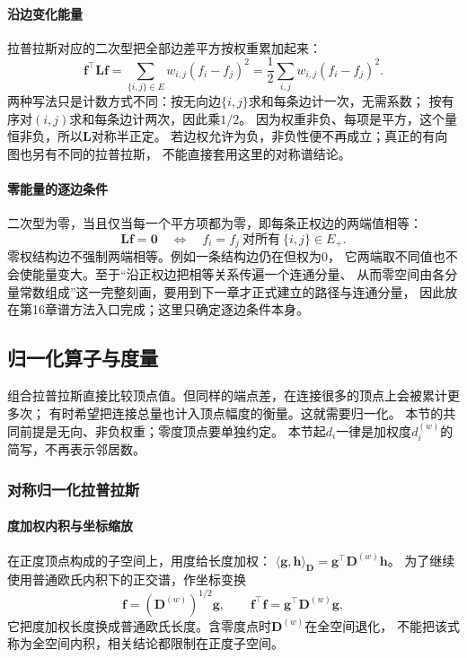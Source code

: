 \paragraph{沿边变化能量}
拉普拉斯对应的二次型把全部边差平方按权重累加起来：
\begin{equation}
  \bm f^\top\bm L\bm f
  =\sum_{\{i,j\}\in E}w_{i,j}(f_i-f_j)^2
  =\frac12\sum_{i,j}w_{i,j}(f_i-f_j)^2.
  \label{eq:graph-theory-dirichlet-energy}
\end{equation}
两种写法只是计数方式不同：按无向边$\{i,j\}$求和每条边计一次，无需系数；
按有序对$(i,j)$求和每条边计两次，因此乘$1/2$。
因为权重非负、每项是平方，这个量恒非负，所以$\bm L$对称半正定。
若边权允许为负，非负性便不再成立；真正的有向图也另有不同的拉普拉斯，
不能直接套用这里的对称谱结论。

\paragraph{零能量的逐边条件}
二次型为零，当且仅当每一个平方项都为零，即每条正权边的两端值相等：
\[
  \bm L\bm f=\bm 0
  \quad\Longleftrightarrow\quad
  f_i=f_j\ \text{对所有}\ \{i,j\}\in E_+.
\]
零权结构边不强制两端相等。例如一条结构边仍在但权为$0$，
它两端取不同值也不会使能量变大。至于“沿正权边把相等关系传遍一个连通分量、
从而零空间由各分量常数组成”这一完整刻画，要用到下一章才正式建立的路径与连通分量，
因此放在第16章谱方法入口完成；这里只确定逐边条件本身。

\subsection{归一化算子与度量}

组合拉普拉斯直接比较顶点值。但同样的端点差，在连接很多的顶点上会被累计更多次；
有时希望把连接总量也计入顶点幅度的衡量。这就需要归一化。
本节的共同前提是无向、非负权重；零度顶点要单独约定。
本节起$d_i$一律是加权度$d_i^{(w)}$的简写，不再表示邻居数。

\subsubsection{对称归一化拉普拉斯}

\paragraph{度加权内积与坐标缩放}
在正度顶点构成的子空间上，用度给长度加权：
$\langle\bm g,\bm h\rangle_{\bm D}=\bm g^\top\bm D^{(w)}\bm h$。
为了继续使用普通欧氏内积下的正交谱，作坐标变换
\begin{equation}
  \bm f=(\bm D^{(w)})^{1/2}\bm g,\qquad
  \bm f^\top\bm f=\bm g^\top\bm D^{(w)}\bm g,
  \label{eq:graph-theory-degree-coordinates}
\end{equation}
它把度加权长度换成普通欧氏长度。含零度点时$\bm D^{(w)}$在全空间退化，
不能把该式称为全空间内积，相关结论都限制在正度子空间。

